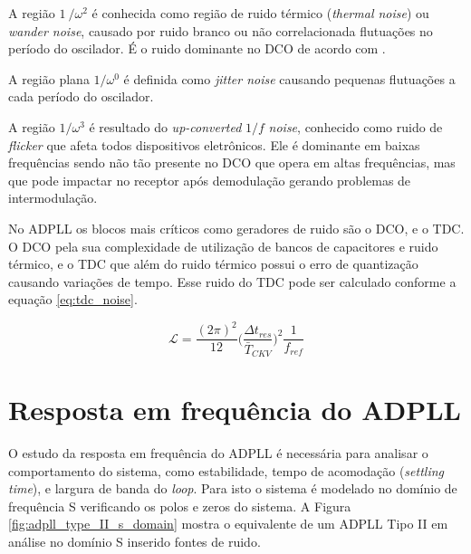 A região $1\ /\omega^2$ é conhecida como região de ruido térmico (\textit{thermal noise}) ou \textit{wander noise}, causado por ruido branco ou não correlacionada flutuações no período do oscilador. É o ruido dominante no DCO de acordo com \cite{staszewski2006all}.

A região plana $1/\omega ^0$ é definida como \textit{jitter noise} causando pequenas flutuações a cada período do oscilador.

A região $1/\omega ^3$ é resultado do \textit{up-converted} $1/f$ \textit{noise}, conhecido como ruido de \textit{flicker} que afeta todos dispositivos eletrônicos. Ele é dominante em baixas frequências sendo não tão presente no DCO que opera em altas frequências, mas que pode impactar no receptor após demodulação gerando problemas de intermodulação.

No ADPLL os blocos mais críticos como geradores de ruido são o DCO, e o TDC. O DCO pela sua complexidade de utilização de bancos de capacitores e ruido térmico, e o TDC que além do ruido térmico possui o erro de quantização causando variações de tempo. Esse ruido do TDC pode ser calculado conforme a equação \ref{eq:tdc_noise}.


 \begin{equation}
	\mathcal{L} = \frac{(2 \pi)^2}{12} \bigg (  \frac{\Delta t_{res}}{\bar{T}_{CKV}}\bigg)^2 \frac{1}{f_{ref}}
	\label{eq:tdc_noise}
\end{equation}

\section{Resposta em frequência do ADPLL}

O estudo da resposta em frequência do ADPLL é necessária para analisar o comportamento do sistema, como estabilidade, tempo de acomodação (\textit{settling time}), e largura de banda do \textit{loop}. Para isto o sistema é modelado no domínio de frequência S verificando os polos e zeros do sistema. A Figura \ref{fig:adpll_type_II_s_domain} mostra o equivalente de um ADPLL Tipo II em análise no domínio S inserido fontes de ruido. 

